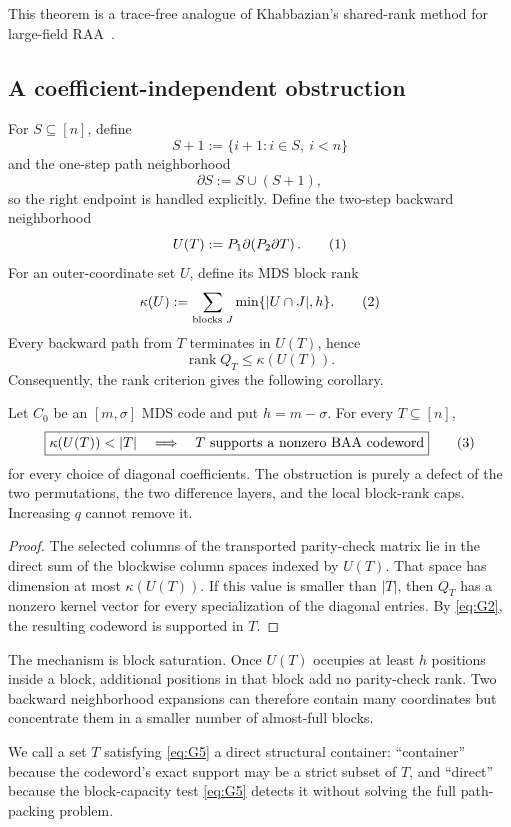 \documentclass[runningheads,envcountsame,envcountsect]{llncs}
\newcommand{\eqnumlabel}[1]{%
  \refstepcounter{equation}\tag{\theequation}\label{#1}%
}
\begin{document}
This theorem is a trace-free analogue of Khabbazian's shared-rank method for
large-field RAA~\cite{khabbazian26}.

\subsection{A coefficient-independent obstruction}

For $S\subseteq[n]$, define
\[
    S+1:=\{i+1:i\in S,\ i<n\}
\]
and the one-step path neighborhood
\[
    \partial S:=S\cup(S+1),
\]
so the right endpoint is handled explicitly.  Define the two-step backward
neighborhood
\[
    U(T):=P_1\partial\!\left(P_2\partial T\right).
    \eqnumlabel{eq:G3}
\]
For an outer-coordinate set $U$, define its MDS block rank
\[
    \kappa(U):=
    \sum_{\text{blocks }J}\min\{|U\cap J|,h\}.
    \eqnumlabel{eq:G4}
\]
Every backward path from $T$ terminates in $U(T)$, hence
\[
    \operatorname{rank}Q_T\le \kappa(U(T)).
\]
Consequently, the rank criterion gives the following corollary.

\begin{proposition}
Let $C_0$ be an $[m,\sigma]$ MDS code and put $h=m-\sigma$.  For every
$T\subseteq[n]$,
\[
    \boxed{
    \kappa(U(T))<|T|
    \quad\Longrightarrow\quad
    T\text{ supports a nonzero BAA codeword}
    }
    \eqnumlabel{eq:G5}
\]
for every choice of diagonal coefficients.  The obstruction is purely a defect
of the two permutations, the two difference layers, and the local block-rank
caps.  Increasing $q$ cannot remove it.
\end{proposition}

\begin{proof}
The selected columns of the transported parity-check matrix lie in the direct
sum of the blockwise column spaces indexed by $U(T)$.  That space has dimension
at most $\kappa(U(T))$.  If this value is smaller than $|T|$, then $Q_T$ has a
nonzero kernel vector for every specialization of the diagonal entries.  By
\eqref{eq:G2}, the resulting codeword is supported in $T$.
\end{proof}

The mechanism is block saturation.  Once $U(T)$ occupies at least $h$ positions
inside a block, additional positions in that block add no parity-check rank.
Two backward neighborhood expansions can therefore contain many coordinates
but concentrate them in a smaller number of almost-full blocks.

We call a set $T$ satisfying \eqref{eq:G5} a direct structural container:
``container'' because the codeword's exact support may be a strict subset of
$T$, and ``direct'' because the block-capacity test \eqref{eq:G5} detects it without
solving the full path-packing problem.
\end{document}
